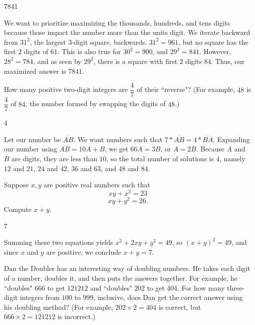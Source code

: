 \documentclass[11pt]{article}
\begin{document}
\begin{answer}
7841
\end{answer}

\begin{solution}
We want to prioritize maximizing the thousands, hundreds, and tens digits because those impact the number more than the units digit. We iterate backward from $31^2$, the largest 3-digit square, backwards. $31^2 = 961$, but no square has the first $2$ digits of $61$. This is also true for $30^2 = 900$, and $29^2 = 841$. However, $28^2 = 784$, and as seen by $29^2$, there is a square with first 2 digits $84$. Thus, our maximized answer is $\boxed{7841}$.
\end{solution}


\begin{problem}
How many positive two-digit integers are $\dfrac{4}{7}$ of their ``reverse"? (For example, $48$ is $\dfrac{4}{7}$ of $84$, the number formed by swapping the digits of $48$.)
\end{problem}

\begin{answer}
4
\end{answer}

\begin{solution}
Let our number be $\overline{AB}$. We want numbers such that $7*\overline{AB} = 4*\overline{BA}$. Expanding our number using 
$\overline{AB} = 10A+B$, we get $66A = 3B$, or $A = 2B$. Because $A$ and $B$ are digits, they are less than $10$, so the total number of 
solutions is $\boxed{4}$, namely $12$ and $21$, $24$ and $42$, $36$ and $63$, and $48$ and $84$.
\end{solution}


\begin{problem}
Suppose $x,y$ are positive real numbers such that \[ xy + x^2 = 23 \]  \[ xy + y^2 = 26.\] Compute $x+y$.
\end{problem}

\begin{answer}
7
\end{answer}

\begin{solution}
Summing these two equations yields $x^2 + 2xy + y^2 = 49$, so $(x+y)^2 = 49$, and since $x$ and $y$ are positive, we conclude $x+y = \boxed{7}$.
\end{solution}


\begin{problem}
Dan the Doubler has an interesting way of doubling numbers. He takes each digit of a number, doubles it, and then puts the answers together. 
For example, he ``doubles" $666$ to get $121212$ and ``doubles" $202$ to get $404$. For how many three-digit integers from $100$ to $999$,
inclusive, does Dan get the correct answer using his doubling method? (For example, $202 \times 2 = 404$ is correct, but $666 \times 2 = 121212$ is incorrect.)
\end{problem}
\end{document}
